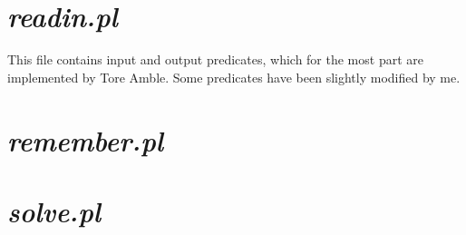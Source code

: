 

\newpage

\section*{\em readin.pl}

This file contains input and output predicates, which for the most
part are implemented by Tore Amble. Some predicates have been slightly
modified by me.

\vspace*{0.5cm}



\newpage

\section*{\em remember.pl}



\newpage

\section*{\em solve.pl}


